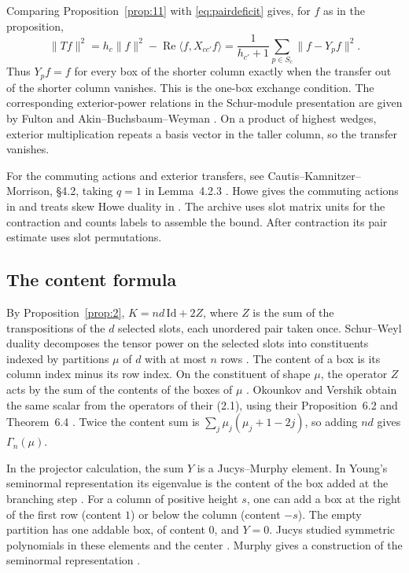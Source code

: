 \documentclass[11pt]{amsart}
\theoremstyle{definition}
\theoremstyle{remark}
\begin{document}
Comparing Proposition~\ref{prop:11} with \eqref{eq:pairdeficit} gives,
for \(f\) as in the proposition,
\[
\|Tf\|^2=h_c\|f\|^2-\operatorname{Re}\langle f,X_{cc'}f\rangle
=\frac{1}{h_{c'}+1}\sum_{p\in S_c}\|f-Y_pf\|^2 .
\]
Thus \(Y_pf=f\) for every box of the shorter column exactly when the
transfer out of the shorter column vanishes. This is the one-box
exchange condition. The corresponding exterior-power relations in the
Schur-module presentation are given by Fulton \cite[\S 8.1]{Fulton}
and Akin--Buchsbaum--Weyman \cite[\S II]{AkinBuchsbaumWeyman}.
On a product of highest wedges, exterior multiplication repeats a
basis vector in the taller column, so the transfer vanishes.

For the commuting actions and exterior transfers, see
Cautis--Kamnitzer--Morrison, \S 4.2, taking \(q=1\) in Lemma~4.2.3
\cite{CKM}. Howe gives the commuting actions in
\cite[Theorem~8 and example~(d)]{Howe} and treats skew Howe duality
in \cite{Howe1995}. The archive uses slot matrix units for the contraction
and counts labels to assemble the bound. After contraction its pair
estimate uses slot permutations.

\subsection{The content formula}

By Proposition~\ref{prop:2}, \(K=nd\,\mathrm{Id}+2Z\), where \(Z\) is the sum of
the transpositions of the \(d\) selected slots, each unordered pair taken
once. Schur--Weyl duality decomposes the tensor power on the selected slots
into constituents indexed by partitions \(\mu\) of \(d\) with at most
\(n\) rows \cite[Theorem~27.3]{EtingofGL}. The content of a box is its
column index minus its row index. On the constituent of shape \(\mu\), the
operator \(Z\) acts by the sum of the contents of the boxes of \(\mu\)
\cite[(4.1) and Proposition~4.1]{Cesi}. Okounkov and Vershik obtain the same
scalar from the operators of their (2.1), using their Proposition~6.2 and
Theorem~6.4 \cite{OkounkovVershik}. Twice the content sum
is \(\sum_j\mu_j(\mu_j+1-2j)\), so adding \(nd\) gives \(\Gamma_n(\mu)\).

In the projector calculation, the sum \(Y\) is a Jucys--Murphy element.
In Young's seminormal representation its eigenvalue is the content of
the box added at the branching step \cite[\S 2, (7)--(9)]{Molev}.
For a column of positive height \(s\), one can add a box at the right of
the first row (content \(1\)) or below the column (content \(-s\)). The
empty partition has one addable box, of content \(0\), and \(Y=0\).
Jucys studied symmetric polynomials in these elements and the center
\cite{Jucys1974}. Murphy gives a construction of the seminormal
representation \cite{Murphy}.
\end{document}
